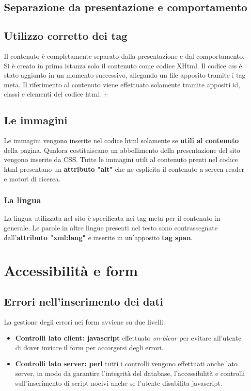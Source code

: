 \documentclass[12pt,a4paper]{article}
\begin{document}
\subsection{Separazione da presentazione e comportamento}
\subsection{Utilizzo corretto dei tag}
Il contenuto è completamente separato dalla presentazione e dal comportamento. 
Si è creato in prima istanza solo il contenuto come codice XHtml. Il codice css è stato aggiunto in un momento successivo, allegando un file apposito tramite i tag meta. 
Il riferimento al contenuto viene effettuato solamente tramite appositi id, classi e elementi del codice html. +
 
\subsection{Le immagini}
Le immagini vengono inserite nel codice html solamente se \textbf{utili al contenuto} della pagina. 
Qualora costituiscano un abbellimento della presentazione del sito vengono inserite da CSS. 
Tutte le immagini utili al contenuto prenti nel codice html presentano un \textbf{attributo "alt"} che ne esplicita il contenuto a screen reader e motori di ricerca. 

\subsubsection{La lingua} La lingua utilizzata nel sito è specificata nei tag meta per il contenuto in generale. 
Le parole in altre lingue presenti nel testo sono contrassegnate dall'\textbf{attributo "xml:lang"}  e inserite in un'apposito \textbf{tag span}.

\section{Accessibilità e form}
\subsection{Errori nell'inserimento dei dati}
La gestione degli errori nei form avviene su due livelli:
\begin{itemize}
	\item \textbf{Controlli lato client: javascript} effettuato \textit{on-bleur} per evitare all'utente di dover inviare il form per accorgersi degli errori.
	\item \textbf{Controlli lato server: perl} tutti i controlli vengono effettuati anche lato server, in modo da garantire l'integrità del database, l'accessibilità e controlli sull'inserimento di script nocivi anche se l'utente disabilita javascript.
\end{itemize}
\end{document}
